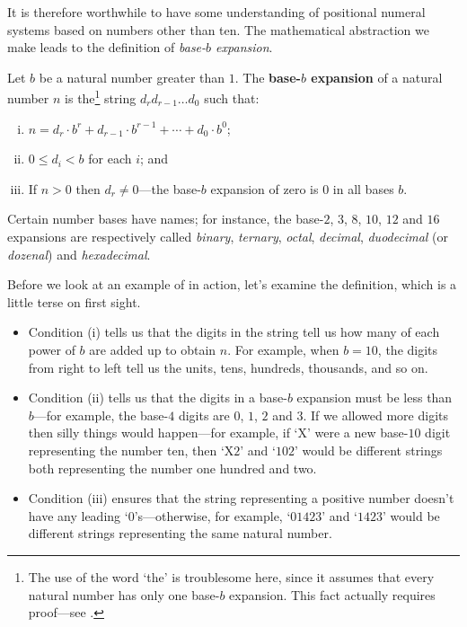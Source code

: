 It is therefore worthwhile to have some understanding of positional numeral systems based on numbers other than ten. The mathematical abstraction we make leads to the definition of \textit{base-$b$ expansion}.

\begin{definition}
\label{defBaseBExpansionPreliminary}
Let $b$ be a natural number greater than $1$. The \textbf{base-$b$ expansion} of a natural number $n$ is the\footnote{The use of the word `the' is troublesome here, since it assumes that every natural number has only one base-$b$ expansion. This fact actually requires proof---see .} string $d_r d_{r-1} \dots d_0$ such that:
\begin{enumerate}[(i)]
\item $n = d_r \cdot b^r + d_{r-1} \cdot b^{r-1} + \cdots + d_0 \cdot b^0$;
\item $0 \le d_i < b$ for each $i$; and
\item If $n>0$ then $d_r \ne 0$---the base-$b$ expansion of zero is $0$ in all bases $b$.
\end{enumerate}
Certain number bases have names; for instance, the base-$2$, $3$, $8$, $10$, $12$ and $16$ expansions are respectively called \textit{binary}, \textit{ternary}, \textit{octal}, \textit{decimal}, \textit{duodecimal} (or \textit{dozenal}) and \textit{hexadecimal}.
\end{definition}

Before we look at an example of  in action, let's examine the definition, which is a little terse on first sight.
\begin{itemize}
\item Condition (i) tells us that the digits in the string tell us how many of each power of $b$ are added up to obtain $n$. For example, when $b=10$, the digits from right to left tell us the units, tens, hundreds, thousands, and so on.
\item Condition (ii) tells us that the digits in a base-$b$ expansion must be less than $b$---for example, the base-$4$ digits are $0$, $1$, $2$ and $3$. If we allowed more digits then silly things would happen---for example, if `$\mathrm{X}$' were a new base-$10$ digit representing the number ten, then `$\mathrm{X}2$' and `$102$' would be different strings both representing the number one hundred and two.
\item Condition (iii) ensures that the string representing a positive number doesn't have any leading `$0$'s---otherwise, for example, `$01423$' and `$1423$' would be different strings representing the same natural number.
\end{itemize}

